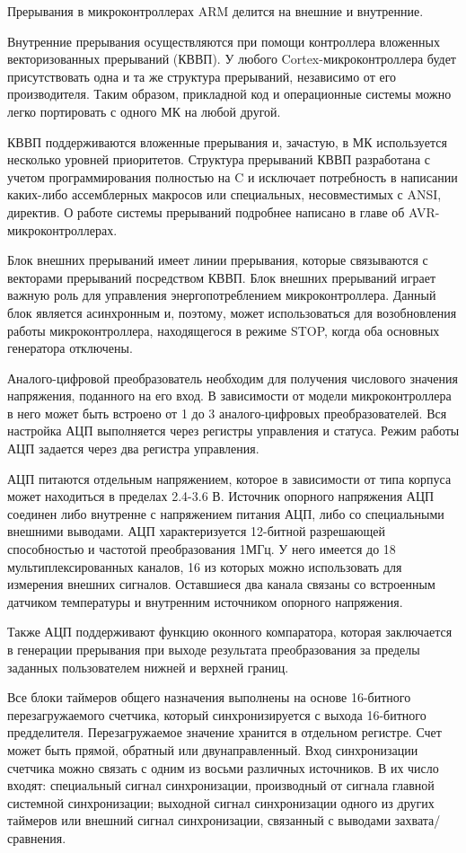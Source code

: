 \documentclass[12pt, oneside]{altsu-report}
\begin{document}
Прерывания в микроконтроллерах ARM делится на внешние и внутренние.

Внутренние прерывания осуществляются при помощи контроллера вложенных векторизованных прерываний (КВВП). У любого Cortex-микроконтроллера будет присутствовать одна и та же структура прерываний, независимо от его производителя. Таким образом, прикладной код и операционные системы можно легко портировать с одного МК на любой другой.

КВВП поддерживаются вложенные прерывания и, зачастую, в МК используется несколько уровней приоритетов. Структура прерываний КВВП разработана с учетом программирования полностью на C и исключает потребность в написании каких-либо ассемблерных макросов или специальных, несовместимых с ANSI, директив. О работе системы прерываний подробнее написано в главе об AVR-микроконтроллерах.

Блок внешних прерываний имеет линии прерывания, которые связываются с векторами прерываний посредством КВВП. Блок внешних прерываний играет важную роль для управления энергопотреблением микроконтроллера. Данный блок является асинхронным и, поэтому, может использоваться для возобновления работы микроконтроллера, находящегося в режиме STOP, когда оба основных генератора отключены.

Аналого-цифровой преобразователь необходим для получения числового значения напряжения, поданного на его вход. В зависимости от модели микроконтроллера в него может быть встроено от 1 до 3 аналого-цифровых преобразователей. Вся настройка АЦП выполняется через регистры управления и статуса. Режим работы АЦП задается через два регистра управления.

АЦП питаются отдельным напряжением, которое в зависимости от типа корпуса может находиться в пределах 2.4-3.6 В. Источник опорного напряжения АЦП соединен либо внутренне с напряжением питания АЦП, либо со специальными внешними выводами. АЦП характеризуется 12-битной разрешающей способностью и частотой преобразования 1МГц. У него имеется до 18 мультиплексированных каналов, 16 из которых можно использовать для измерения внешних сигналов. Оставшиеся два канала связаны со встроенным датчиком температуры и внутренним источником опорного напряжения.

Также АЦП поддерживают функцию оконного компаратора, которая заключается в генерации прерывания при выходе результата преобразования за пределы заданных пользователем нижней и верхней границ.

Все блоки таймеров общего назначения выполнены на основе 16-битного перезагружаемого счетчика, который синхронизируется с выхода 16-битного предделителя. Перезагружаемое значение хранится в отдельном регистре. Счет может быть прямой, обратный или двунаправленный. Вход синхронизации счетчика можно связать с одним из восьми различных источников. В их число входят: специальный сигнал синхронизации, производный от сигнала главной системной синхронизации; выходной сигнал синхронизации одного из других таймеров или внешний сигнал синхронизации, связанный с выводами захвата/сравнения.
\end{document}
